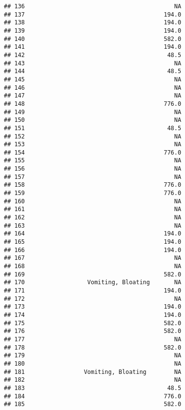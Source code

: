 \documentclass[
]{article}
\begin{document}
\begin{verbatim}
## 136                                           NA
## 137                                        194.0
## 138                                        194.0
## 139                                        194.0
## 140                                        582.0
## 141                                        194.0
## 142                                         48.5
## 143                                           NA
## 144                                         48.5
## 145                                           NA
## 146                                           NA
## 147                                           NA
## 148                                        776.0
## 149                                           NA
## 150                                           NA
## 151                                         48.5
## 152                                           NA
## 153                                           NA
## 154                                        776.0
## 155                                           NA
## 156                                           NA
## 157                                           NA
## 158                                        776.0
## 159                                        776.0
## 160                                           NA
## 161                                           NA
## 162                                           NA
## 163                                           NA
## 164                                        194.0
## 165                                        194.0
## 166                                        194.0
## 167                                           NA
## 168                                           NA
## 169                                        582.0
## 170                  Vomiting, Bloating       NA
## 171                                        194.0
## 172                                           NA
## 173                                        194.0
## 174                                        194.0
## 175                                        582.0
## 176                                        582.0
## 177                                           NA
## 178                                        582.0
## 179                                           NA
## 180                                           NA
## 181                 Vomiting, Bloating        NA
## 182                                           NA
## 183                                         48.5
## 184                                        776.0
## 185                                        582.0

\end{verbatim}
\end{document}
